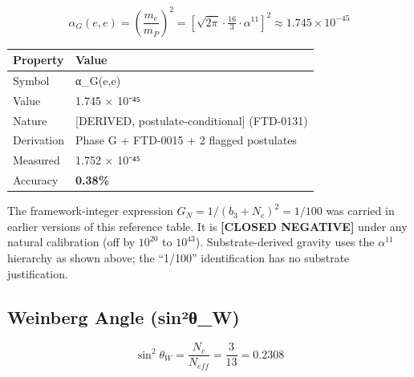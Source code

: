 \documentclass[
  11pt,
  letterpaper,
  twoside,
  openright]{book}
\begin{document}
\[
\alpha_G(e,e) = \left(\frac{m_e}{m_P}\right)^2 = \left[\sqrt{2\pi}\cdot\tfrac{16}{3}\cdot\alpha^{11}\right]^2 \approx 1.745 \times 10^{-45}
\]

\begin{longtable}[]{@{}ll@{}}
\toprule\noalign{}
Property & Value \\
\midrule\noalign{}
\endhead
\bottomrule\noalign{}
\endlastfoot
Symbol & α\_G(e,e) \\
Value & 1.745 × 10⁻⁴⁵ \\
Nature & {[}DERIVED, postulate-conditional{]} (FTD-0131) \\
Derivation & Phase G + FTD-0015 + 2 flagged postulates \\
Measured & 1.752 × 10⁻⁴⁵ \\
Accuracy & \textbf{0.38\%} \\
\end{longtable}

\begin{tcolorbox}[enhanced jigsaw, coltitle=black, colbacktitle=quarto-callout-warning-color!10!white, toprule=.15mm, colframe=quarto-callout-warning-color-frame, arc=.35mm, opacityback=0, bottomtitle=1mm, toptitle=1mm, breakable, colback=white, titlerule=0mm, opacitybacktitle=0.6, title=\textcolor{quarto-callout-warning-color}{\faExclamationTriangle}\hspace{0.5em}{Earlier ``Gravity Bias = 1/100'' reading is closed-negative (FTD-0131)}, rightrule=.15mm, bottomrule=.15mm, leftrule=.75mm, left=2mm]

The framework-integer expression \(G_N = 1/(b_3+N_c)^2 = 1/100\) was
carried in earlier versions of this reference table. It is
\textbf{{[}CLOSED NEGATIVE{]}} under any natural calibration (off by
\(10^{20}\) to \(10^{43}\)). Substrate-derived gravity uses the
\(\alpha^{11}\) hierarchy as shown above; the ``1/100'' identification
has no substrate justification.

\end{tcolorbox}

\subsection{Weinberg Angle
(sin²θ\_W)}\label{weinberg-angle-sinuxb2ux3b8_w}

\[
\sin^2\theta_W = \frac{N_c}{N_{eff}} = \frac{3}{13} = 0.2308
\]
\end{document}
